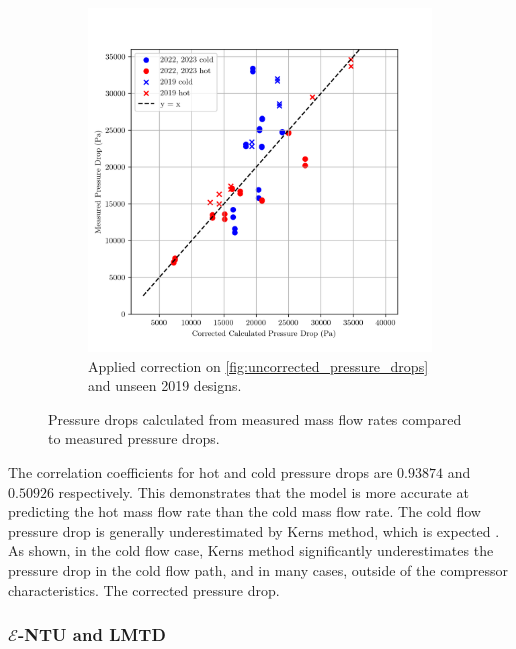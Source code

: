 \documentclass{article}
\begin{document}
\begin{figure}[H]
\begin{subfigure}{.49\textwidth}
    \includegraphics[width=.95\linewidth]{dp_ccalc_vs_meas.png}
    \caption{Applied correction on \ref{fig:uncorrected_pressure_drops} and unseen 2019 designs.}
    \label{fig:corrected_pressure_drops}
  \end{subfigure}
  \caption{Pressure drops calculated from measured mass flow rates compared to measured pressure drops.}
  \label{fig:pressure_drops}
\end{figure}

\vspace{-0.5cm}

The correlation coefficients for hot and cold pressure drops are $\mathbf{0.93874}$ and $\mathbf{0.50926}$ respectively.
This demonstrates that the model is more accurate at predicting the hot mass flow rate than the cold mass flow rate.
The cold flow pressure drop is generally underestimated by Kerns method, which is expected \cite{HE_design}.
As shown, in the cold flow case, Kerns method significantly underestimates the pressure drop in the cold flow path, and in many cases, outside of the compressor characteristics.
The corrected pressure drop.

\subsubsection{$\mathcal{E}$-NTU and LMTD}
\end{document}
